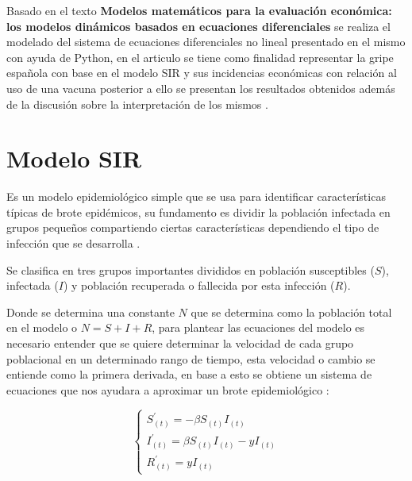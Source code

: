 Basado en el texto \textbf{Modelos matemáticos para la evaluación económica: los modelos dinámicos
basados en ecuaciones diferenciales} se realiza el modelado del sistema de ecuaciones diferenciales no lineal presentado en el mismo con ayuda de Python, en el articulo se tiene como finalidad representar la gripe española con base en el modelo SIR y sus incidencias económicas con relación al uso de una vacuna posterior a ello se presentan los resultados obtenidos además de la discusión sobre la interpretación de los mismos \cite{articulo-sir}.

\section{Modelo SIR}

Es un modelo epidemiológico simple que se usa para identificar características típicas de brote epidémicos, su fundamento es dividir la población infectada en grupos pequeños compartiendo ciertas características dependiendo el tipo de infección que se desarrolla \cite{modelo-sir-xd}.

Se clasifica en tres grupos importantes divididos en población susceptibles ($S$), infectada ($I$) y población recuperada o fallecida por esta infección ($R$).

Donde se determina una constante $N$ que se determina como  la población total en el modelo o $N=S+I+R$, para plantear las ecuaciones del modelo es necesario entender que se quiere determinar la velocidad de cada grupo poblacional en un determinado rango de tiempo, esta velocidad o cambio se entiende como la primera derivada, en base a esto se obtiene un sistema de ecuaciones que nos ayudara a aproximar un brote epidemiológico \cite{modelo-sir-tesis}:


\begin{equation}
\label{sistema_no_vacuna} 
\left\{
    \begin{array}{lr}
        S^\prime_{(t)} = -\beta S_{(t)} I_{(t)}\\
        I^\prime_{(t)} = \beta S_{(t)} I_{(t)} - yI_{(t)}\\
        R^\prime_{(t)} = yI_{(t)} 
    \end{array}
\right.
\end{equation}


